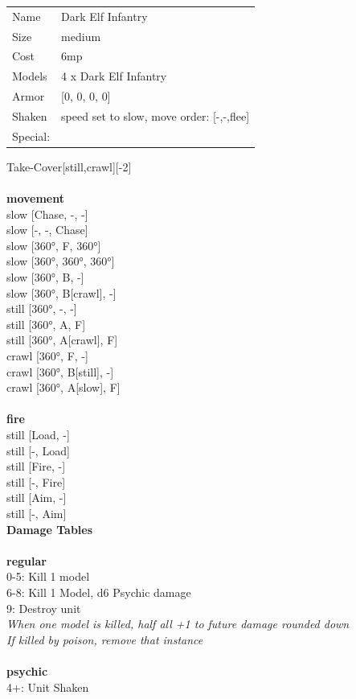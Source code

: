 {\begin{tabular}{ll}
  Name & Dark Elf Infantry \\
  Size & medium\\
  Cost & 6mp\\
  Models & 4 x Dark Elf Infantry\\
  Armor & [0, 0, 0, 0]\\
  Shaken & speed set to slow, move order: [-,-,flee]\\
  Special: \\
\end{tabular}

\noindent Take-Cover[still,crawl][-2]\\ 


\ \\ {\bf movement } \\
slow [Chase, -, -] \\
slow [-, -, Chase] \\
slow [360°, F, 360°] \\
slow [360°, 360°, 360°] \\
slow [360°, B, -] \\
slow [360°, B[crawl], -] \\
still [360°, -, -] \\
still [360°, A, F] \\
still [360°, A[crawl], F] \\
crawl [360°, F, -] \\
crawl [360°, B[still], -] \\
crawl [360°, A[slow], F] \\
\ \\ {\bf fire } \\
still [Load, -] \\
still [-, Load] \\
still [Fire, -] \\
still [-, Fire] \\
still [Aim, -] \\
still [-, Aim] \\


{\bf Damage Tables} \\
\ \\ {\bf regular } \\
0-5: Kill 1 model \\
6-8: Kill 1 Model, d6 Psychic damage \\
9: Destroy unit \\
{{\it When one model is killed, half all +1 to future damage rounded down}} \\
{{\it If killed by poison, remove that instance}} \\
\ \\ {\bf psychic } \\
4+: Unit Shaken \\


}
